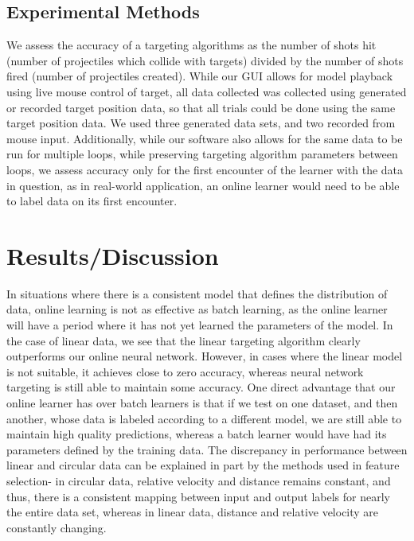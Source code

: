 \documentclass[11pt,letterpaper]{article}
\begin{document}
\subsection{Experimental Methods}
We assess the accuracy of a targeting algorithms as the number of shots hit (number of projectiles which collide with targets) divided by the number of shots fired (number of projectiles created). While our GUI allows for model playback using live mouse control of target, all data collected was collected using generated or recorded target position data, so that all trials could be done using the same target position data. We used three generated data sets, and two recorded from mouse input. Additionally, while our software also allows for the same data to be run for multiple loops, while preserving targeting algorithm parameters between loops, we assess accuracy only for the first encounter of the learner with the data in question, as in real-world application, an online learner would need to be able to label data on its first encounter.

\section{Results/Discussion}

In situations where there is a consistent model that defines the distribution of data, online learning is not as effective as batch learning, as the online learner will have a period where it has not yet learned the parameters of the model. In the case of linear data, we see that the linear targeting algorithm clearly outperforms our online neural network. However, in cases where the linear model is not suitable, it achieves close to zero accuracy, whereas neural network targeting is still able to maintain some accuracy. One direct advantage that our online learner has over batch learners is that if we test on one dataset, and then another, whose data is labeled according to a different model, we are still able to maintain high quality predictions, whereas a batch learner would have had its parameters defined by the training data. The discrepancy in performance between linear and circular data can be explained in part by the methods used in feature selection- in circular data, relative velocity and distance remains constant, and thus, there is a consistent mapping between input and output labels for nearly the entire data set, whereas in linear data, distance and relative velocity are constantly changing.
\end{document}
